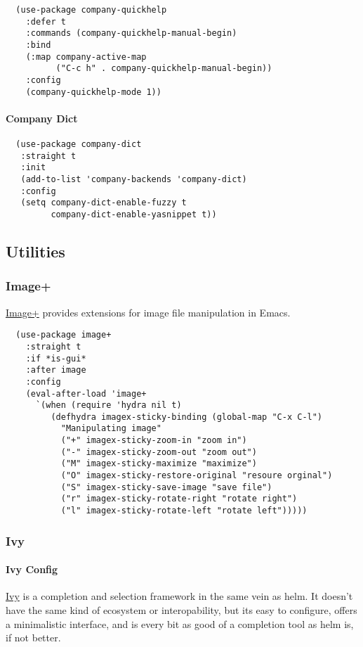 \documentclass[11pt]{article}
\begin{document}
\begin{verbatim}
  (use-package company-quickhelp
    :defer t
    :commands (company-quickhelp-manual-begin)
    :bind
    (:map company-active-map
          ("C-c h" . company-quickhelp-manual-begin))
    :config
    (company-quickhelp-mode 1))
\end{verbatim}

\paragraph*{Company Dict}
\label{sec:orgf4d7107}

\begin{verbatim}
  (use-package company-dict
   :straight t
   :init
   (add-to-list 'company-backends 'company-dict)
   :config
   (setq company-dict-enable-fuzzy t
         company-dict-enable-yasnippet t))
\end{verbatim}

\subsection*{Utilities}
\label{sec:org7a90020}
\subsubsection*{Image+}
\label{sec:org10f386b}

\href{https://github.com/mhayashi1120/Emacs-imagex}{Image+}  provides extensions for image file manipulation in Emacs.

\begin{verbatim}
  (use-package image+
    :straight t
    :if *is-gui*
    :after image
    :config
    (eval-after-load 'image+
      `(when (require 'hydra nil t)
         (defhydra imagex-sticky-binding (global-map "C-x C-l")
           "Manipulating image"
           ("+" imagex-sticky-zoom-in "zoom in")
           ("-" imagex-sticky-zoom-out "zoom out")
           ("M" imagex-sticky-maximize "maximize")
           ("O" imagex-sticky-restore-original "resoure orginal")
           ("S" imagex-sticky-save-image "save file")
           ("r" imagex-sticky-rotate-right "rotate right")
           ("l" imagex-sticky-rotate-left "rotate left")))))
\end{verbatim}

\subsubsection*{Ivy}
\label{sec:org1357c2e}
\paragraph*{Ivy Config}
\label{sec:orgb50a575}
\href{https://github.com/abo-abo/swiper}{Ivy} is a completion and selection framework in the same vein
as helm.
It doesn't have the same kind of ecosystem or interopability,
but its easy to configure, offers a minimalistic interface,
and is every bit as good of a completion tool as helm is,
if not better.
\end{document}
